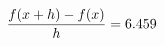 \documentclass[preview]{standalone}
\begin{document}
\begin{align*}
\special{dvisvgm:raw <g id='unique000'>}\frac{f(x+h)-f(x)}{h} = 6.459\special{dvisvgm:raw </g>}
\end{align*}
\end{document}

